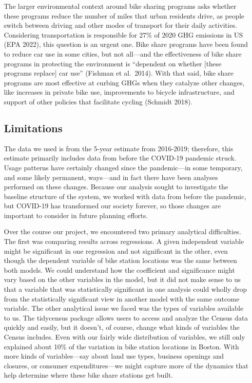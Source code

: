 \documentclass[
  12pt,
]{article}
\begin{document}
The larger environmental context around bike sharing programs asks
whether these programs reduce the number of miles that urban residents
drive, as people switch between driving and other modes of transport for
their daily activities. Considering transportation is responsible for
27\% of 2020 GHG emissions in US (EPA 2022), this question is an urgent
one. Bike share programs have been found to reduce car use in some
cities, but not all---and the effectiveness of bike share programs in
protecting the environment is ``dependent on whether {[}these programs
replace{]} car use'' (Fishman et al.~2014). With that said, bike share
programs are most effective at curbing GHGs when they catalyze other
changes, like increases in private bike use, improvements to bicycle
infrastructure, and support of other policies that facilitate cycling
(Schmidt 2018).

\hypertarget{limitations}{%
\subsection{Limitations}\label{limitations}}

The data we used is from the 5-year estimate from 2016-2019; therefore,
this estimate primarily includes data from before the COVID-19 pandemic
struck. Usage patterns have certainly changed since the pandemic---in
some temporary, and some likely permanent, ways---and in fact there have
been analyses performed on these changes. Because our analysis sought to
investigate the baseline structure of the system, we worked with data
from before the pandemic, but COVID-19 has transformed our society
forever, so those changes are important to consider in future planning
efforts.

Over the course our project, we encountered two primary analytical
difficulties. The first was comparing results across regressions. A
given independent variable might be significant in one regression and
not significant in the other, even though the dependent variable of bike
station locations was the same between both models. We could understand
how the coefficient and significance might vary based on the other
variables in the model, but it did not make sense to us that a variable
that was statistically significant in one analysis could wholly drop
from the statistically significant view in another model with the same
outcome variable. The other analytical issue we faced was the types of
variables available to us. The tidycensus package allows users to access
and analyze the Census data quickly and easily, but it doesn't, of
course, change what kinds of variables the Census includes. Even with
our fairly wide distribution of variables, we still only explained about
10\% of the variation in bike station locations in Boston. With more
kinds of variables---say about land use types, business openings and
closures, or consumer expenditures---we might capture more of the
dynamics that help determine where these bike share stations get built.
\end{document}
